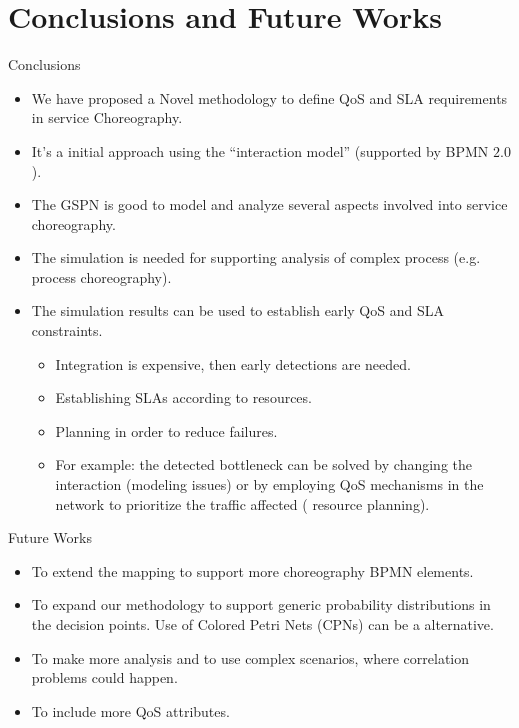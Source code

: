 \documentclass[xcolor=svgnames]{beamer}
\begin{document}
\section{Conclusions and Future Works}
   \begin{frame}{Conclusions}
       \begin{itemize}
         \item <1->  We have proposed a Novel methodology to define  QoS and SLA requirements in service Choreography.
         \item <2-> It's a  initial approach using the ``interaction model'' (supported by BPMN $2.0$).
         \item <3-> The GSPN is good to model and analyze several aspects involved into service choreography.
         \item <4-> The simulation is needed for supporting analysis of complex process (e.g. process choreography).
     	 \item <5-> The simulation results can be used to establish early QoS and SLA constraints.
            \begin{itemize}
              \item Integration is expensive, then early detections are needed.
              \item Establishing SLAs according to resources.
              \item Planning in order to reduce failures.
              \item For example: the detected bottleneck can be solved by changing the interaction (modeling issues) or by employing QoS mechanisms in the network to prioritize the traffic affected ( resource planning).
            \end{itemize}
       \end{itemize}
   \end{frame}


  \begin{frame}{Future Works}
       \begin{itemize}
         \item <1-> To extend the mapping to support more choreography BPMN elements.
    	 \item <2-> To expand our methodology to support generic probability distributions in the decision points. Use of Colored Petri Nets (CPNs) can be a alternative.
         \item <3-> To make more analysis and to use complex scenarios, where correlation problems could happen.
         \item <4-> To include more QoS attributes.

       \end{itemize}
   \end{frame}
\end{document}
